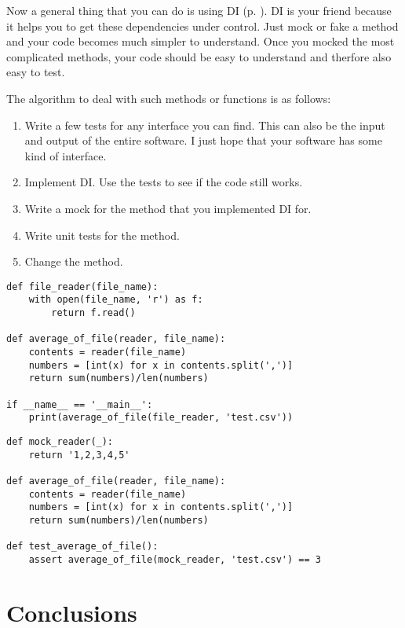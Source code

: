 Now a general thing that you can do is using DI (p. \pageref{sec:dependency_injection}). DI is your friend because it helps you to get these dependencies under control. Just mock or fake a method and your code becomes much simpler to understand. Once you mocked the most complicated methods, your code should be easy to understand and therfore also easy to test.

The algorithm to deal with such methods or functions is as follows:
\begin{enumerate}
    \item Write a few tests for any interface you can find. This can also be the input and output of the entire software. I just hope that your software has some kind of interface.
    \item Implement DI. Use the tests to see if the code still works.
    \item Write a mock for the method that you implemented DI for.
    \item Write unit tests for the method.
    \item Change the method.
\end{enumerate}


\begin{programcode}{}
\begin{verbatim}
def file_reader(file_name):
    with open(file_name, 'r') as f:
        return f.read()

def average_of_file(reader, file_name):
    contents = reader(file_name)
    numbers = [int(x) for x in contents.split(',')]
    return sum(numbers)/len(numbers)

if __name__ == '__main__':
    print(average_of_file(file_reader, 'test.csv'))
\end{verbatim}
\end{programcode}


\begin{programcode}{}
\begin{verbatim}
def mock_reader(_):
    return '1,2,3,4,5'

def average_of_file(reader, file_name):
    contents = reader(file_name)
    numbers = [int(x) for x in contents.split(',')]
    return sum(numbers)/len(numbers)

def test_average_of_file():
    assert average_of_file(mock_reader, 'test.csv') == 3
\end{verbatim}
\end{programcode}
 
\chapter{Conclusions}

